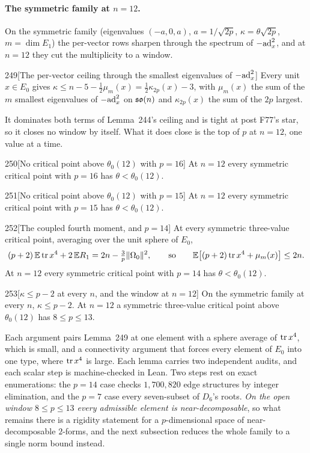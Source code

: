 \paragraph{The symmetric family at $n=12$.} On the symmetric family (eigenvalues $(-a,0,a)$, $a=1/\sqrt{2p}$, $\kappa=\theta\sqrt{2p}$, $m=\dim E_1$) the per-vector rows sharpen through the spectrum of $-\mathrm{ad}_x^2$, and at $n=12$ they cut the multiplicity to a window.

\begin{Lem}{249}[The per-vector ceiling through the smallest eigenvalues of $-\mathrm{ad}_x^2$]
Every unit $x\in E_0$ gives $\kappa\le n-5-\tfrac12\mu_m(x)=\tfrac12\kappa_{2p}(x)-3$, with $\mu_m(x)$ the sum of the $m$ smallest eigenvalues of $-\mathrm{ad}_x^2$ on $\mathfrak{so}(n)$ and $\kappa_{2p}(x)$ the sum of the $2p$ largest.
\end{Lem}

It dominates both terms of Lemma~244's ceiling and is tight at post F77's star, so it closes no window by itself. What it does close is the top of $p$ at $n=12$, one value at a time.

\begin{Lem}{250}[No critical point above $\theta_0(12)$ with $p=16$]
At $n=12$ every symmetric critical point with $p=16$ has $\theta<\theta_0(12)$.
\end{Lem}

\begin{Lem}{251}[No critical point above $\theta_0(12)$ with $p=15$]
At $n=12$ every symmetric critical point with $p=15$ has $\theta<\theta_0(12)$.
\end{Lem}

\begin{Lem}{252}[The coupled fourth moment, and $p=14$]
At every symmetric three-value critical point, averaging over the unit sphere of $E_0$,
\[
(p+2)\,\mathbb E\operatorname{tr} x^4+2\,\mathbb ER_1=2n-\tfrac3p\lVert\Omega_0\rVert^2,\qquad\text{so}\qquad\mathbb E\big[(p+2)\operatorname{tr} x^4+\mu_m(x)\big]\le2n .
\]
At $n=12$ every symmetric critical point with $p=14$ has $\theta<\theta_0(12)$.
\end{Lem}

\begin{Lem}{253}[$\kappa\le p-2$ at every $n$, and the window at $n=12$]
On the symmetric family at every $n$, $\kappa\le p-2$. At $n=12$ a symmetric three-value critical point above $\theta_0(12)$ has $8\le p\le13$.
\end{Lem}

Each argument pairs Lemma~249 at one element with a sphere average of $\operatorname{tr} x^4$, which is small, and a connectivity argument that forces every element of $E_0$ into one type, where $\operatorname{tr} x^4$ is large. Each lemma carries two independent audits, and each scalar step is machine-checked in Lean. Two steps rest on exact enumerations: the $p=14$ case checks $1{,}700{,}820$ edge structures by integer elimination, and the $p=7$ case every seven-subset of $D_6$'s roots. \emph{On the open window $8\le p\le13$ every admissible element is near-decomposable}, so what remains there is a rigidity statement for a $p$-dimensional space of near-decomposable $2$-forms, and the next subsection reduces the whole family to a single norm bound instead.

